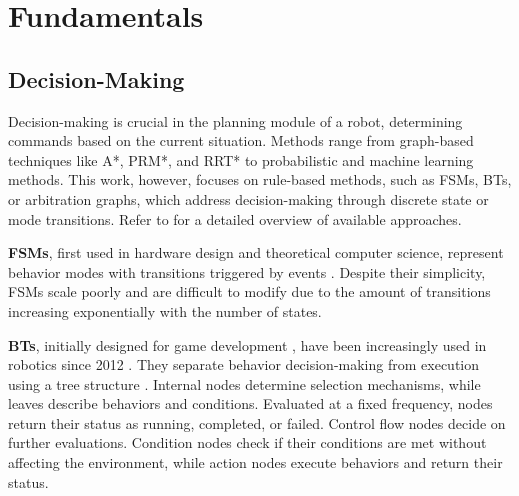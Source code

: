 
\section{Fundamentals}

\subsection{Decision-Making}

Decision-making is crucial in the planning module of a robot, determining commands based on the current situation.
Methods range from graph-based techniques like A*, PRM*, and RRT* to probabilistic and machine learning methods.
This work, however, focuses on rule-based methods, such as \glspl{FSM}, \glspl{BT}, or arbitration graphs, which address decision-making through discrete state or mode transitions.
Refer to \cite{schwartingPlanningDecisionMakingAutonomous2018,yurtseverSurveyAutonomousDriving2020,gammellAsymptoticallyOptimalSamplingBased2021}
for a detailed overview of available approaches.

\textbf{\glspl{FSM}}, first used in hardware design and theoretical computer science,
represent behavior modes with transitions triggered by events \cite{wagnerModelingSoftwareFinite2006}.
Despite their simplicity, \glspl{FSM} scale poorly and are difficult to modify due to the amount of transitions increasing exponentially with the number of states.

\textbf{\glspl{BT}}, initially designed for game development \cite{iovinoProgrammingEffortRequired2022},
have been increasingly used in robotics since 2012 \cite{bagnellIntegratedSystemAutonomous2012,ogrenIncreasingModularityUAV2012}.
They separate behavior decision-making from execution using a tree structure \cite{colledanchiseBehaviorTreesRobotics2018}.
Internal nodes determine selection mechanisms, while leaves describe behaviors and conditions.
Evaluated at a fixed frequency, nodes return their status as running, completed, or failed.
Control flow nodes decide on further evaluations.
%
Condition nodes check if their conditions are met without affecting the environment, while action nodes execute behaviors and return their status.

